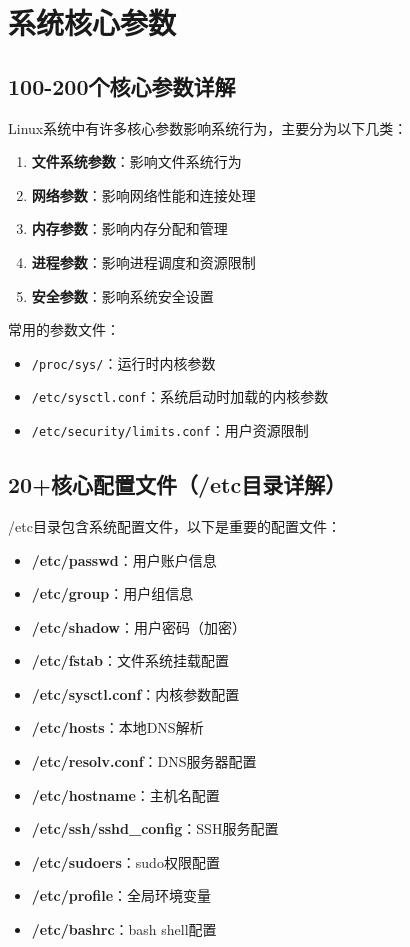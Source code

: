 \documentclass[12pt,UTF8]{ctexbook}
\begin{document}
\chapter{系统核心参数}
\label{chap:core-parameters}

\section{100-200个核心参数详解}
\label{sec:core-params}

Linux系统中有许多核心参数影响系统行为，主要分为以下几类：

\begin{enumerate}
    \item \textbf{文件系统参数}：影响文件系统行为
    \item \textbf{网络参数}：影响网络性能和连接处理
    \item \textbf{内存参数}：影响内存分配和管理
    \item \textbf{进程参数}：影响进程调度和资源限制
    \item \textbf{安全参数}：影响系统安全设置
\end{enumerate}

常用的参数文件：
\begin{itemize}
    \item \texttt{/proc/sys/}：运行时内核参数
    \item \texttt{/etc/sysctl.conf}：系统启动时加载的内核参数
    \item \texttt{/etc/security/limits.conf}：用户资源限制
\end{itemize}

\section{20+核心配置文件（/etc目录详解）}
\label{sec:core-configs}

/etc目录包含系统配置文件，以下是重要的配置文件：

\begin{itemize}
    \item \textbf{/etc/passwd}：用户账户信息
    \item \textbf{/etc/group}：用户组信息
    \item \textbf{/etc/shadow}：用户密码（加密）
    \item \textbf{/etc/fstab}：文件系统挂载配置
    \item \textbf{/etc/sysctl.conf}：内核参数配置
    \item \textbf{/etc/hosts}：本地DNS解析
    \item \textbf{/etc/resolv.conf}：DNS服务器配置
    \item \textbf{/etc/hostname}：主机名配置
    \item \textbf{/etc/ssh/sshd\_config}：SSH服务配置
    \item \textbf{/etc/sudoers}：sudo权限配置
    \item \textbf{/etc/profile}：全局环境变量
    \item \textbf{/etc/bashrc}：bash shell配置
\end{itemize}
\end{document}
